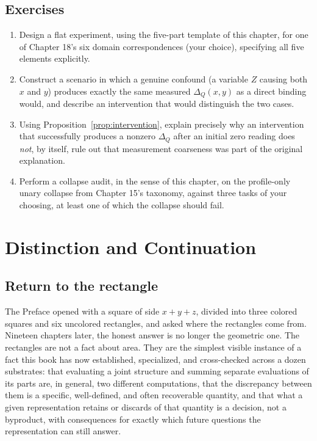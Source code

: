 \documentclass[11pt]{book}
\begin{document}
\section*{Exercises}
\begin{enumerate}
\item Design a flat experiment, using the five-part template of this chapter, for one of Chapter 18's six domain correspondences (your choice), specifying all five elements explicitly.
\item Construct a scenario in which a genuine confound (a variable $Z$ causing both $x$ and $y$) produces exactly the same measured $\Delta_Q(x,y)$ as a direct binding would, and describe an intervention that would distinguish the two cases.
\item Using Proposition~\ref{prop:intervention}, explain precisely why an intervention that successfully produces a nonzero $\Delta_Q$ after an initial zero reading does \emph{not}, by itself, rule out that measurement coarseness was part of the original explanation.
\item Perform a collapse audit, in the sense of this chapter, on the profile-only unary collapse from Chapter 15's taxonomy, against three tasks of your choosing, at least one of which the collapse should fail.
\end{enumerate}

\chapter{Distinction and Continuation}

\section{Return to the rectangle}

The Preface opened with a square of side $x+y+z$, divided into three colored squares and six uncolored rectangles, and asked where the rectangles come from. Nineteen chapters later, the honest answer is no longer the geometric one. The rectangles are not a fact about area. They are the simplest visible instance of a fact this book has now established, specialized, and cross-checked across a dozen substrates: that evaluating a joint structure and summing separate evaluations of its parts are, in general, two different computations, that the discrepancy between them is a specific, well-defined, and often recoverable quantity, and that what a given representation retains or discards of that quantity is a decision, not a byproduct, with consequences for exactly which future questions the representation can still answer.
\end{document}
